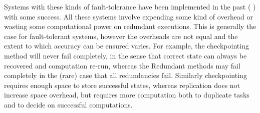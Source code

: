 Systems with these kinds of fault-tolerance have been implemented in the past (\cite{ree06} \cite{lit07}) with some success.
All these systems involve expending some kind of overhead or wasting some computational power on redundant executions.
This is generally the case for fault-tolerant systems, however the overheads are not equal and the extent to which accuracy can be ensured varies.
For example, the checkpointing method will never fail completely, in the sense that correct state can always be recovered and computation re-run, whereas the Redundant methods may fail completely in the (rare) case that all redundancies fail.
Similarly checkpointing requires enough space to store successful states, whereas replication does not increase space overhead, but requires more computation both to duplicate tasks and to decide on successful computations.
